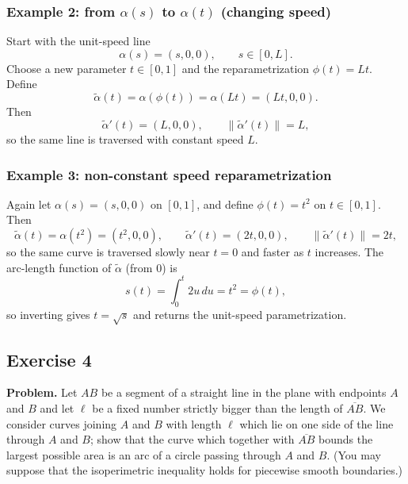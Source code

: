 \documentclass[12pt,a4paper]{article}
\theoremstyle{plain}
\theoremstyle{definition}      %
\begin{document}
	\subsubsection*{Example 2: from $\alpha(s)$ to $\alpha(t)$ (changing speed)}
	Start with the unit-speed line
	\[
	\alpha(s)=(s,0,0),\qquad s\in[0,L].
	\]
	Choose a new parameter $t\in[0,1]$ and the reparametrization $\phi(t)=Lt$. Define
	\[
	\widetilde\alpha(t)=\alpha(\phi(t))=\alpha(Lt)=(Lt,0,0).
	\]
	Then
	\[
	\widetilde\alpha'(t)=(L,0,0),\qquad \|\widetilde\alpha'(t)\|=L,
	\]
	so the same line is traversed with constant speed $L$.
	
	\subsubsection*{Example 3: non-constant speed reparametrization}
	Again let $\alpha(s)=(s,0,0)$ on $[0,1]$, and define $\phi(t)=t^2$ on $t\in[0,1]$.
	Then
	\[
	\widetilde\alpha(t)=\alpha(t^2)=(t^2,0,0),
	\qquad
	\widetilde\alpha'(t)=(2t,0,0),
	\qquad
	\|\widetilde\alpha'(t)\|=2t,
	\]
	so the same curve is traversed slowly near $t=0$ and faster as $t$ increases.
	The arc-length function of $\widetilde\alpha$ (from $0$) is
	\[
	s(t)=\int_0^t 2u\,du=t^2=\phi(t),
	\]
	so inverting gives $t=\sqrt{s}$ and returns the unit-speed parametrization.
	
	
	\subsection*{Exercise 4}
	
	\noindent\textbf{Problem.}
	Let $AB$ be a segment of a straight line in the plane with endpoints $A$ and $B$ and let $\ell$ be a fixed number
	strictly bigger than the length of $\overline{AB}$. We consider curves joining $A$ and $B$ with length $\ell$ which lie on
	one side of the line through $A$ and $B$; show that the curve which together with $\overline{AB}$ bounds the largest possible
	area is an arc of a circle passing through $A$ and $B$. (You may suppose that the isoperimetric inequality holds for
	piecewise smooth boundaries.)
	
\end{document}
